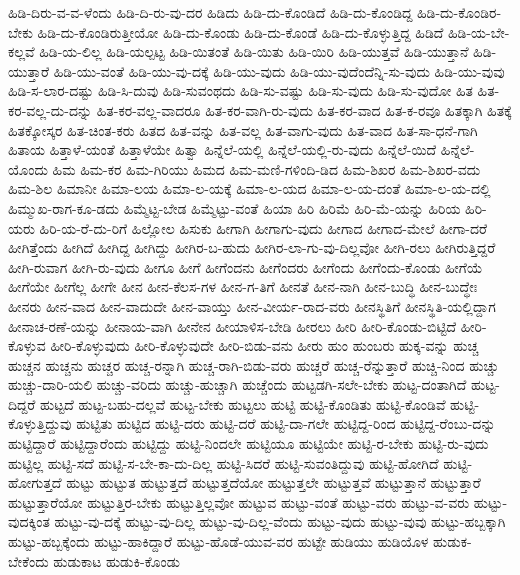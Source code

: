 ಹಿಡಿ-ದಿರು-ವ-ವ-ಳೆಂದು
ಹಿಡಿ-ದಿ-ರು-ವು-ದರ
ಹಿಡಿದು
ಹಿಡಿ-ದು-ಕೊಂಡಿದೆ
ಹಿಡಿ-ದು-ಕೊಂಡಿದ್ದ
ಹಿಡಿ-ದು-ಕೊಂಡಿರ-ಬೇಕು
ಹಿಡಿ-ದು-ಕೊಂಡಿರುತ್ತೀಯೋ
ಹಿಡಿ-ದು-ಕೊಂಡು
ಹಿಡಿ-ದು-ಕೊಂಡೆ
ಹಿಡಿ-ದು-ಕೊಳ್ಳುತ್ತಿದ್ದ
ಹಿಡಿದೆ
ಹಿಡಿ-ಯ-ಬೇ-ಕಲ್ಲವೆ
ಹಿಡಿ-ಯ-ಲಿಲ್ಲ
ಹಿಡಿ-ಯಲ್ಪಟ್ಟ
ಹಿಡಿ-ಯಿತಂತೆ
ಹಿಡಿ-ಯಿತು
ಹಿಡಿ-ಯಿರಿ
ಹಿಡಿ-ಯುತ್ತವೆ
ಹಿಡಿ-ಯುತ್ತಾನೆ
ಹಿಡಿ-ಯುತ್ತಾರೆ
ಹಿಡಿ-ಯು-ವಂತೆ
ಹಿಡಿ-ಯು-ವು-ದಕ್ಕೆ
ಹಿಡಿ-ಯು-ವುದು
ಹಿಡಿ-ಯು-ವುದೆಂದೆನ್ನಿ-ಸು-ವುದು
ಹಿಡಿ-ಯು-ವುವು
ಹಿಡಿ-ಸ-ಲಾರ-ದಷ್ಟು
ಹಿಡಿ-ಸಿ-ದುವು
ಹಿಡಿ-ಸುವಂಥದು
ಹಿಡಿ-ಸು-ವಷ್ಟು
ಹಿಡಿ-ಸು-ವುದು
ಹಿಡಿ-ಸು-ವುದೋ
ಹಿತ
ಹಿತ-ಕರ-ವಲ್ಲ-ದು-ದನ್ನು
ಹಿತ-ಕರ-ವಲ್ಲ-ವಾದರೂ
ಹಿತ-ಕರ-ವಾಗಿ-ರು-ವುದು
ಹಿತ-ಕರ-ವಾದ
ಹಿತ-ಕ-ರವೂ
ಹಿತಕ್ಕಾಗಿ
ಹಿತಕ್ಕೆ
ಹಿತಕ್ಕೋಸ್ಕರ
ಹಿತ-ಚಿಂತ-ಕರು
ಹಿತದ
ಹಿತ-ವನ್ನು
ಹಿತ-ವಲ್ಲ
ಹಿತ-ವಾಗು-ವುದು
ಹಿತ-ವಾದ
ಹಿತ-ಸಾ-ಧನೆ-ಗಾಗಿ
ಹಿತಾಯ
ಹಿತ್ತಾಳೆ-ಯಂತೆ
ಹಿತ್ತಾಳೆಯೇ
ಹಿತ್ವಾ
ಹಿನ್ನೆಲೆ-ಯಲ್ಲಿ
ಹಿನ್ನೆಲೆ-ಯಲ್ಲಿ-ರು-ವುದು
ಹಿನ್ನೆಲೆ-ಯಿದೆ
ಹಿನ್ನೆಲೆ-ಯೊಂದು
ಹಿಮ
ಹಿಮ-ಕರ
ಹಿಮ-ಗಿರಿಯು
ಹಿಮದ
ಹಿಮ-ಮಣಿ-ಗಳಿಂದಿ-ಡಿದ
ಹಿಮ-ಶಿಖರ
ಹಿಮ-ಶಿಖರ-ವದು
ಹಿಮ-ಶಿಲ
ಹಿಮಾನೀ
ಹಿಮಾ-ಲಯ
ಹಿಮಾ-ಲ-ಯಕ್ಕೆ
ಹಿಮಾ-ಲ-ಯದ
ಹಿಮಾ-ಲ-ಯ-ದಂತೆ
ಹಿಮಾ-ಲ-ಯ-ದಲ್ಲಿ
ಹಿಮ್ಮುಖ-ರಾಗ-ಕೂ-ಡದು
ಹಿಮ್ಮೆಟ್ಟ-ಬೇಡ
ಹಿಮ್ಮೆಟ್ಟು-ವಂತೆ
ಹಿಯಾ
ಹಿರಿ
ಹಿರಿಮೆ
ಹಿರಿ-ಮೆ-ಯನ್ನು
ಹಿರಿಯ
ಹಿರಿ-ಯರು
ಹಿರಿ-ಯ-ರೆ-ದು-ರಿಗೆ
ಹಿಲ್ಲೋಲ
ಹಿಸುಕು
ಹೀಗಾಗಿ
ಹೀಗಾಗು-ವುದು
ಹೀಗಾದ
ಹೀಗಾದ-ಮೇಲೆ
ಹೀಗಾ-ದರೆ
ಹೀಗಿತ್ತೆಂದು
ಹೀಗಿದೆ
ಹೀಗಿದ್ದ
ಹೀಗಿದ್ದು
ಹೀಗಿರ-ಬ-ಹುದು
ಹೀಗಿರ-ಲಾ-ಗು-ವು-ದಿಲ್ಲವೋ
ಹೀಗಿ-ರಲು
ಹೀಗಿರುತ್ತಿದ್ದರೆ
ಹೀಗಿ-ರುವಾಗ
ಹೀಗಿ-ರು-ವುದು
ಹೀಗೂ
ಹೀಗೆ
ಹೀಗೆಂದನು
ಹೀಗೆಂದರು
ಹೀಗೆಂದು
ಹೀಗೆಂದು-ಕೊಂಡು
ಹೀಗೆಯೆ
ಹೀಗೆಯೇ
ಹೀಗೆಲ್ಲ
ಹೀಗೇ
ಹೀನ
ಹೀನ-ಕೆಲಸ-ಗಳ
ಹೀನ-ಗ-ತಿಗೆ
ಹೀನತೆ
ಹೀನ-ನಾಗಿ
ಹೀನ-ಬುದ್ಧಿ
ಹೀನ-ಬುದ್ಧೇಃ
ಹೀನರು
ಹೀನ-ವಾದ
ಹೀನ-ವಾದುದೇ
ಹೀನ-ವಾಯ್ತು
ಹೀನ-ವೀರ್ಯ-ರಾದ-ವರು
ಹೀನಸ್ಥಿತಿಗೆ
ಹೀನಸ್ಥಿತಿ-ಯಲ್ಲಿದ್ದಾಗ
ಹೀನಾಚ-ರಣೆ-ಯನ್ನು
ಹೀನಾಯ-ವಾಗಿ
ಹೀನೇನ
ಹೀಯಾಳಿಸ-ಬೇಡಿ
ಹೀರಲು
ಹೀರಿ
ಹೀರಿ-ಕೊಂಡು-ಬಿಟ್ಟಿದೆ
ಹೀರಿ-ಕೊಳ್ಳುವ
ಹೀರಿ-ಕೊಳ್ಳುವುದು
ಹೀರಿ-ಕೊಳ್ಳುವುದೇ
ಹೀರಿ-ಬಿಡು-ವನು
ಹೀರು
ಹುಂ
ಹುಂಬರು
ಹುಕ್ಕ-ವನ್ನು
ಹುಚ್ಚ
ಹುಚ್ಚನ
ಹುಚ್ಚನು
ಹುಚ್ಚರ
ಹುಚ್ಚ-ರನ್ನಾಗಿ
ಹುಚ್ಚ-ರಾಗಿ-ಬಿಡು-ವರು
ಹುಚ್ಚರೆ
ಹುಚ್ಚ-ರೆನ್ನುತ್ತಾರೆ
ಹುಚ್ಚಿ-ನಿಂದ
ಹುಚ್ಚು
ಹುಚ್ಚು-ದಾರಿ-ಯಲಿ
ಹುಚ್ಚು-ವರಿದು
ಹುಚ್ಚು-ಹುಚ್ಚಾಗಿ
ಹುಚ್ಚೆಂದು
ಹುಟ್ಟಡಗಿ-ಸಲೇ-ಬೇಕು
ಹುಟ್ಟ-ದಂತಾಗಿದೆ
ಹುಟ್ಟ-ದಿದ್ದರೆ
ಹುಟ್ಟದೆ
ಹುಟ್ಟ-ಬಹು-ದಲ್ಲವೆ
ಹುಟ್ಟ-ಬೇಕು
ಹುಟ್ಟಲು
ಹುಟ್ಟಿ
ಹುಟ್ಟಿ-ಕೊಂಡಿತು
ಹುಟ್ಟಿ-ಕೊಂಡಿವೆ
ಹುಟ್ಟಿ-ಕೊಳ್ಳುತ್ತಿದ್ದುವು
ಹುಟ್ಟಿತು
ಹುಟ್ಟಿದ
ಹುಟ್ಟಿ-ದರು
ಹುಟ್ಟಿ-ದರೆ
ಹುಟ್ಟಿ-ದಾ-ಗಲೇ
ಹುಟ್ಟಿದ್ದ-ರಿಂದ
ಹುಟ್ಟಿದ್ದ-ರೆಂಬು-ದನ್ನು
ಹುಟ್ಟಿದ್ದಾರೆ
ಹುಟ್ಟಿದ್ದಾರೆಂದು
ಹುಟ್ಟಿದ್ದು
ಹುಟ್ಟಿ-ನಿಂದಲೇ
ಹುಟ್ಟಿಯೂ
ಹುಟ್ಟಿಯೇ
ಹುಟ್ಟಿ-ರ-ಬೇಕು
ಹುಟ್ಟಿ-ರು-ವುದು
ಹುಟ್ಟಿಲ್ಲ
ಹುಟ್ಟಿ-ಸದೆ
ಹುಟ್ಟಿ-ಸ-ಬೇ-ಕಾ-ದು-ದಿಲ್ಲ
ಹುಟ್ಟಿ-ಸಿದರೆ
ಹುಟ್ಟಿ-ಸುವಂತಿದ್ದುವು
ಹುಟ್ಟಿ-ಹೋಗಿದೆ
ಹುಟ್ಟಿ-ಹೋಗುತ್ತದೆ
ಹುಟ್ಟು
ಹುಟ್ಟುತ
ಹುಟ್ಟುತ್ತದೆ
ಹುಟ್ಟುತ್ತದೆಯೋ
ಹುಟ್ಟುತ್ತಲೇ
ಹುಟ್ಟುತ್ತವೆ
ಹುಟ್ಟುತ್ತಾನೆ
ಹುಟ್ಟುತ್ತಾರೆ
ಹುಟ್ಟುತ್ತಾರೆಯೋ
ಹುಟ್ಟುತ್ತಿರ-ಬೇಕು
ಹುಟ್ಟುತ್ತಿಲ್ಲವೋ
ಹುಟ್ಟುವ
ಹುಟ್ಟು-ವಂತೆ
ಹುಟ್ಟು-ವರು
ಹುಟ್ಟು-ವ-ವರು
ಹುಟ್ಟು-ವುದಕ್ಕಿಂತ
ಹುಟ್ಟು-ವು-ದಕ್ಕೆ
ಹುಟ್ಟು-ವು-ದಿಲ್ಲ
ಹುಟ್ಟು-ವು-ದಿಲ್ಲ-ವೆಂದು
ಹುಟ್ಟು-ವುದು
ಹುಟ್ಟು-ವುವು
ಹುಟ್ಟು-ಹಬ್ಬಕ್ಕಾಗಿ
ಹುಟ್ಟು-ಹಬ್ಬಕ್ಕೆಂದು
ಹುಟ್ಟು-ಹಾಕಿದ್ದಾರೆ
ಹುಟ್ಟು-ಹೊಡೆ-ಯುವ-ವರ
ಹುಟ್ಟೇ
ಹುಡಿಯು
ಹುಡಿಯೊಳ
ಹುಡುಕ-ಬೇಕೆಂದು
ಹುಡುಕಾಟ
ಹುಡುಕಿ-ಕೊಂಡು
